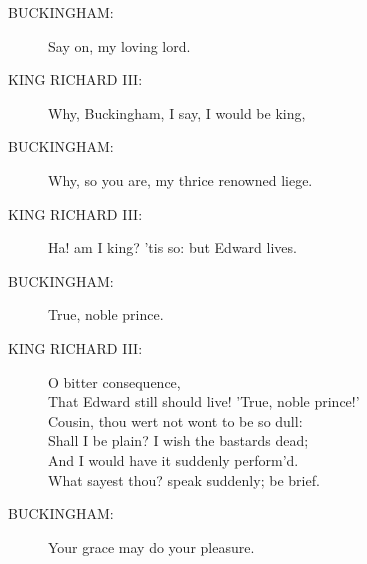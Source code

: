 \documentclass{article}
\begin{document}
\begin{description}
\item[BUCKINGHAM:] 
\hspace{1pt}Say on, my loving lord.\\
\end{description}
\begin{description}
\item[KING RICHARD III:] 
\hspace{1pt}Why, Buckingham, I say, I would be king,\\
\end{description}
\begin{description}
\item[BUCKINGHAM:] 
\hspace{1pt}Why, so you are, my thrice renowned liege.\\
\end{description}
\begin{description}
\item[KING RICHARD III:] 
\hspace{1pt}Ha! am I king? 'tis so: but Edward lives.\\
\end{description}
\begin{description}
\item[BUCKINGHAM:] 
\hspace{1pt}True, noble prince.\\
\end{description}
\begin{description}
\item[KING RICHARD III:] 
\hspace{1pt}O bitter consequence,\\
\hspace{1pt}That Edward still should live! 'True, noble prince!'\\
\hspace{1pt}Cousin, thou wert not wont to be so dull:\\
\hspace{1pt}Shall I be plain? I wish the bastards dead;\\
\hspace{1pt}And I would have it suddenly perform'd.\\
\hspace{1pt}What sayest thou? speak suddenly; be brief.\\
\end{description}
\begin{description}
\item[BUCKINGHAM:] 
\hspace{1pt}Your grace may do your pleasure.\\
\end{description}
\end{document}
